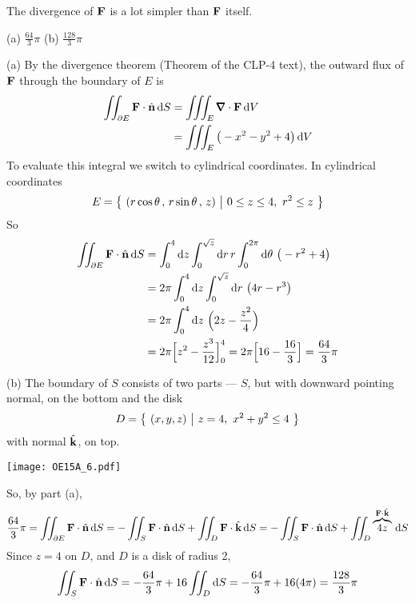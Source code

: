 \begin{hint} 
The divergence of $\mathbf{F}$ is a lot simpler than $\mathbf{F}$ itself.
\end{hint}

\begin{answer} 
(a) $\frac{64}{3}\pi$\qquad
(b) $\frac{128}{3}\pi$
\end{answer}

\begin{solution} (a)
By the divergence theorem (Theorem  of the 
CLP-4 text), the outward flux of $\mathbf{F}$ through the boundary of $E$ is
\begin{align*}
\dblInt_{\partial E}\vF\cdot\hn\,\dee{S}
&=\tripInt_E \vnabla\cdot\vF\,\dee{V} \\
&=\tripInt_E \big(-x^2-y^2+4\big)\,\dee{V} 
\end{align*}
To evaluate this integral we switch to cylindrical coordinates.
In cylindrical coordinates
\begin{equation*}
E=\big\{ \ (r\cos\theta\,,\,r\sin\theta\,,\,z)\ \big|\ 0\le z\le 4,\ r^2\le z\ \big\}
\end{equation*}
So
\begin{align*}
\dblInt_{\partial E}\vF\cdot\hn\,\dee{S}
&=\int_0^4\dee{z}\int_0^{\sqrt{z}}\dee{r}\,r\int_0^{2\pi}\dee{\theta}\ 
         \big(-r^2+4\big) \\
&=2\pi \int_0^4\dee{z}\int_0^{\sqrt{z}}\dee{r}\ \big(4r-r^3\big) \\
&=2\pi \int_0^4\dee{z}\ \Big(2z-\frac{z^2}{4}\Big) \\
&= 2\pi\Big[z^2-\frac{z^3}{12}\Big]_0^4
=2\pi\Big[16-\frac{16}{3}\Big]
=\frac{64}{3}\pi
\end{align*}

(b) The boundary of $S$ consists of two parts --- $S$, but with downward
pointing normal, on the bottom and the disk
\begin{equation*}
D =\big\{ \ (x,y,z)\ \big|\ z=4,\ x^2+y^2\le 4\ \big\}
\end{equation*} 
with normal $\hat{\mathbf{k}}$, on top.
 \begin{center}
    \texttt{[image: OE15A\_6.pdf]}
\end{center}
So, by part (a),
\begin{align*}
\frac{64}{3}\pi =\iint_{\partial E}\mathbf{F}\cdot\hat{\mathbf{n}}\,\mathrm{d}S
=-\iint_S \mathbf{F}\cdot\hat{\mathbf{n}}\,\mathrm{d}S 
  +\iint_D \mathbf{F}\cdot\hat{\mathbf{k}}\,\mathrm{d}S
=-\iint_S \mathbf{F}\cdot\hat{\mathbf{n}}\,\mathrm{d}S 
  +\iint_D \overbrace{4z}^{\mathbf{F}\cdot\hat{\mathbf{k}}}\,\mathrm{d}S
\end{align*}
Since $z=4$ on $D$, and $D$ is a disk of radius 2,
\begin{align*}
\iint_S \mathbf{F}\cdot\hat{\mathbf{n}}\,\mathrm{d}S 
=-\frac{64}{3}\pi +16\iint_D \mathrm{d}S
=-\frac{64}{3}\pi +16(4\pi)
=\frac{128}{3}\pi
\end{align*}
\end{solution}


